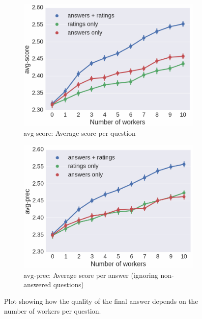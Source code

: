 \begin{figure}
  \begin{subfigure}[t]{0.5\textwidth}
    \centering
    \includegraphics[width=\textwidth]{img/crqa_nworkers_vs_accuracy}
    \caption{avg-score: Average score per question}
    \label{figure:crqa:nworkers_vs_accuracy}
  \end{subfigure}
  \begin{subfigure}[t]{0.5\textwidth}
    \centering
    \includegraphics[width=\textwidth]{img/crqa_nworkers_vs_precision}
    \caption{avg-prec: Average score per answer (ignoring non-answered questions)}
    \label{figure:crqa:nworkers_vs_precision}
  \end{subfigure}
    \caption{Plot showing how the quality of the final answer depends on the number of workers per question.}
    \label{figure:non-factoid:crowdsourcing:crqa:nworkers_vs_quality}
\end{figure}


